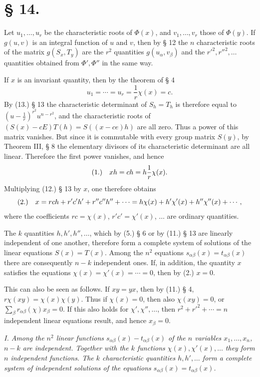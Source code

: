 \documentclass[11pt]{article}
\newcommand{\fnum}[1]{\textup{(\ensuremath{#1}.)}\quad}
\begin{document}
\section*{§ 14.}

Let $u_1,\ldots,u_r$ be the characteristic roots of $\Phi(x)$, and $v_1,\ldots,v_r$ those of $\Phi(y)$. If $g(u,v)$ is an integral function of $u$ and $v$, then by § 12 the $n$ characteristic roots of the matrix $g(S_x,T_y)$ are the $r^2$ quantities $g(u_\alpha,v_\beta)$ and the $r'^2,r''^2,\ldots$ quantities obtained from $\Phi',\Phi''$ in the same way.

If $x$ is an invariant quantity, then by the theorem of § 4
\[
 u_1=\cdots=u_r=\frac1r\chi(x)=c.
\]
By (13.) § 13 the characteristic determinant of $S_h=T_h$ is therefore equal to $(u-\frac1r)^{r^2}u^{n-r^2}$, and the characteristic roots of $(S(x)-cE)T(h)=S((x-ce)h)$ are all zero. Thus a power of this matrix vanishes. But since it is commutable with every group matrix $S(y)$, by Theorem III, § 8 the elementary divisors of its characteristic determinant are all linear. Therefore the first power vanishes, and hence
\[
\fnum{1} xh=ch=h\frac1r\chi(x).
\]
Multiplying (12.) § 13 by $x$, one therefore obtains
\[
\fnum{2} x=rch+r'c'h'+r''c''h''+\cdots
=h\chi(x)+h'\chi'(x)+h''\chi''(x)+\cdots,
\]
where the coefficients $rc=\chi(x)$, $r'c'=\chi'(x)$, $\ldots$ are ordinary quantities.

The $k$ quantities $h,h',h'',\ldots$, which by (5.) § 6 or by (11.) § 13 are linearly independent of one another, therefore form a complete system of solutions of the linear equations $S(x)=T(x)$. Among the $n^2$ equations $s_{\alpha\beta}(x)=t_{\alpha\beta}(x)$ there are consequently $n-k$ independent ones. If, in addition, the quantity $x$ satisfies the equations $\chi(x)=\chi'(x)=\cdots=0$, then by (2.) $x=0$.

This can also be seen as follows. If $xy=yx$, then by (11.) § 4, $r\chi(xy)=\chi(x)\chi(y)$. Thus if $\chi(x)=0$, then also $\chi(xy)=0$, or $\sum_\beta r_{\alpha\beta}(\chi)x_\beta=0$. If this also holds for $\chi',\chi'',\ldots$, then $r^2+r'^2+\cdots=n$ independent linear equations result, and hence $x_\beta=0$.

\emph{I. Among the $n^2$ linear functions $s_{\alpha\beta}(x)-t_{\alpha\beta}(x)$ of the $n$ variables $x_1,\ldots,x_n$, $n-k$ are independent. Together with the $k$ functions $\chi(x),\chi'(x),\ldots$ they form $n$ independent functions. The $k$ characteristic quantities $h,h',\ldots$ form a complete system of independent solutions of the equations $s_{\alpha\beta}(x)=t_{\alpha\beta}(x)$.}
\end{document}
